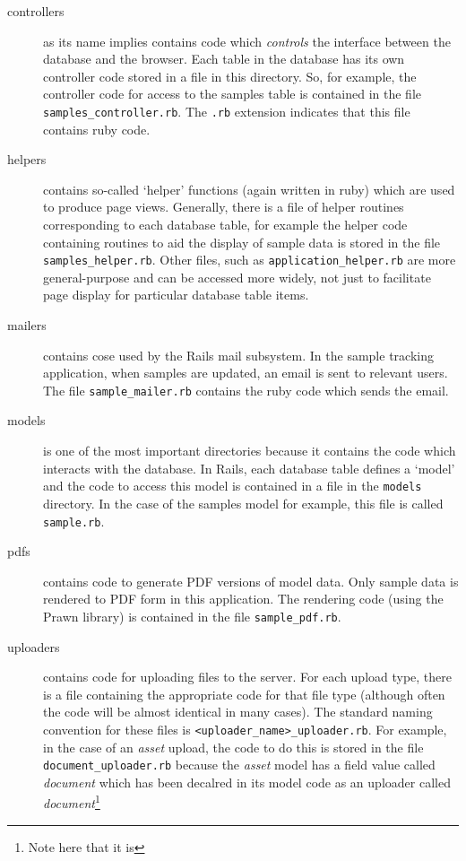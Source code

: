 \documentclass[12pt,twoside]{article}
\begin{document}
\begin{description}
\item[controllers]
as its name implies contains code which \emph{controls} the interface
between the database and the browser. Each table in the database has its
own controller code stored in a file in this directory. So, for example, the
controller code for access to the samples table is contained in the file
\verb=samples_controller.rb=. The \verb=.rb= extension indicates that this
file contains ruby code.
\item[helpers]
contains so-called `helper' functions (again written in ruby) which are
used to produce page views. Generally, there is a file of helper
routines corresponding to each database table, for example the helper
code containing routines to aid the display of sample data is stored in
the file \verb=samples_helper.rb=. Other files, such as
\verb=application_helper.rb= are more general-purpose and can be accessed
more widely, not just to facilitate page display for particular database
table items.
\item[mailers]
contains cose used by the Rails mail subsystem. In the sample tracking
application, when samples are updated, an email is sent to relevant users.
The file \verb=sample_mailer.rb= contains the ruby code which sends the
email.
\item[models]
is one of the most important directories because it contains the code
which interacts with the database. In Rails, each database table defines
a `model' and the code to access this model is contained in a file in the
\verb=models= directory. In the case of the samples model for example, this
file is called \verb=sample.rb=.
\item[pdfs]
contains code to generate PDF versions of model data. Only sample data is
rendered to PDF form in this application. The rendering code (using the
Prawn library) is contained in the file \verb=sample_pdf.rb=.
\item[uploaders]
contains code for uploading files to the server. For each upload type, there
is a file containing the appropriate code for that file type (although
often the code will be almost identical in many cases). The standard
naming convention
for these files is \verb=<uploader_name>_uploader.rb=. For example, in the
case of an \emph{asset} upload, the code to do this is stored in the
file \verb=document_uploader.rb= because the \emph{asset} model has
a field value called \emph{document} which has been decalred in its model
code as an uploader called \emph{document}\footnote{Note here that it is
}
\end{description}
\end{document}
